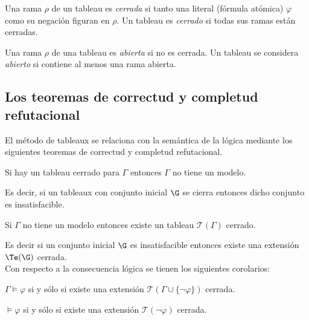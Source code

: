 \documentclass[11pt,letterpaper]{article}
\begin{document}
\begin{definicion}
 Una rama $\rho$ %
 de un tableau es \emph{cerrada } si tanto una literal (fórmula 
 atómica) $\varphi$ como su negación figuran en $\rho$. Un tableau es 
 \emph{cerrado} si todas sus ramas están cerradas.
\end{definicion}

\begin{definicion}
 Una rama $\rho$ de una tableau es \emph{abierta} si  no es cerrada. Un
 tableau se considera \emph{abierto} si contiene al menos una rama abierta.
\end{definicion}


\subsection{Los teoremas de correctud y completud refutacional}

El método de tableaux se relaciona con la semántica de la lógica mediante los 
siguientes teoremas de correctud y completud refutacional.

\begin{teorema}[Correctud]
Si hay un tableau cerrado para $\Gamma$ entonces $\Gamma$ no tiene un modelo.
\end{teorema}
\noindent
Es decir, si un tableaux con conjunto inicial $\G$ se cierra entonces
dicho conjunto es insatisfacible.

\begin{teorema}
Si $\Gamma$ no tiene un modelo entonces existe un tableau $\mathcal{T}(\Gamma)$
cerrado. 
\end{teorema}
\noindent
Es decir si un conjunto inicial $\G$ es insatisfacible entonces 
existe una extensión $\Te(\G)$ cerrada.\\

\noindent
Con respecto a la consecuencia lógica se tienen los siguientes corolarios:

\begin{corolario}
 $\Gamma \models \varphi$ si y s\'olo si existe una extensión
 $\mathcal{T}(\Gamma \cup \{ \lnot\varphi \})$ cerrada.
\end{corolario}

\begin{corolario}
 $\models\varphi$  si y s\'olo si existe una extensión $\mathcal{T}(\lnot
 \varphi)$ cerrada.
\end{corolario}
\end{document}

